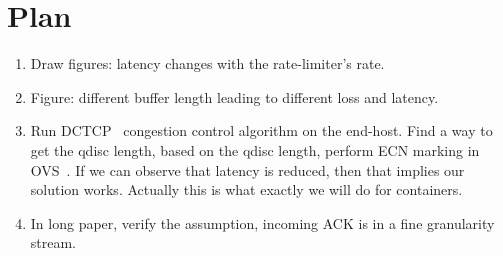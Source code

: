 \section*{Plan}
\begin{enumerate}
\item Draw figures: latency changes with the rate-limiter's rate.
\item Figure: different buffer length leading to different loss and latency.
\item Run DCTCP~\cite{alizadeh2010data} congestion control algorithm on the end-host. 
Find a way to get the qdisc length, based on the qdisc length, 
perform ECN marking in OVS~\cite{he2016ac,cronkite2016virtualized}. If we can observe that latency is reduced, 
then that implies our solution works. Actually this is what exactly we will do for containers.

\item In long paper, verify the assumption, incoming ACK is in a fine granularity stream.
\end{enumerate}


\pagebreak
\fi
